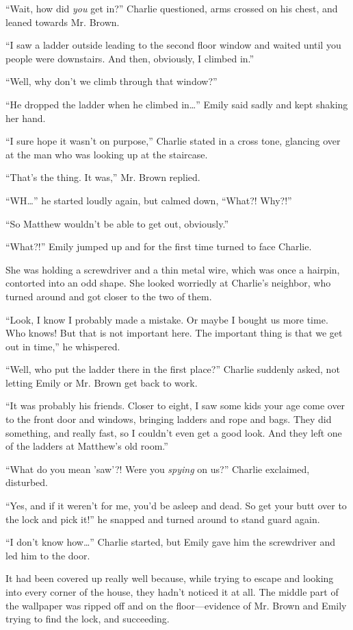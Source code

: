 “Wait, how did \textit{you} get in?” Charlie questioned, arms crossed on his chest, and leaned towards Mr. Brown.

“I saw a ladder outside leading to the second floor window and waited until you people were downstairs. And then, obviously, I climbed in.”

“Well, why don't we climb through that window?”

“He dropped the ladder when he climbed in…” Emily said sadly and kept shaking her hand.

“I sure hope it wasn't on purpose,” Charlie stated in a cross tone, glancing over at the man who was looking up at the staircase.

“That's the thing. It was,” Mr. Brown replied.

“WH…” he started loudly again, but calmed down, “What?! Why?!”

“So Matthew wouldn't be able to get out, obviously.”

“What?!” Emily jumped up and for the first time turned to face Charlie.

She was holding a screwdriver and a thin metal wire, which was once a hairpin, contorted into an odd shape. She looked worriedly at Charlie's neighbor, who turned around and got closer to the two of them.

“Look, I know I probably made a mistake. Or maybe I bought us more time. Who knows! But that is not important here. The important thing is that we get out in time,” he whispered.

“Well, who put the ladder there in the first place?” Charlie suddenly asked, not letting Emily or Mr. Brown get back to work.

“It was probably his friends. Closer to eight, I saw some kids your age come over to the front door and windows, bringing ladders and rope and bags. They did something, and really fast, so I couldn't even get a good look. And they left one of the ladders at Matthew's old room.”

“What do you mean 'saw'?! Were you \textit{spying} on us?” Charlie exclaimed, disturbed.

“Yes, and if it weren't for me, you'd be asleep and dead. So get your butt over to the lock and pick it!” he snapped and turned around to stand guard again.

“I don't know how…” Charlie started, but Emily gave him the screwdriver and led him to the door.

It had been covered up really well because, while trying to escape and looking into every corner of the house, they hadn't noticed it at all. The middle part of the wallpaper was ripped off and on the floor—evidence of Mr. Brown and Emily trying to find the lock, and succeeding.

